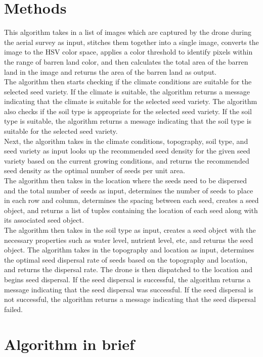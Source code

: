\documentclass[pmlr,twocolumn,10pt]{jmlr}
\begin{document}
\section*{Methods}
 This algorithm takes in a list of images which are captured by the drone during the aerial survey as input, stitches them together into a single image, converts the image to the HSV color space, applies a color threshold to identify pixels within the range of barren land color, and then calculates the total area of the barren land in the image and returns the area of the barren land as output.
 \\The algorithm then starts checking if the climate conditions are suitable for the selected seed variety. If the climate is suitable, the algorithm returns a message indicating that the climate is suitable for the selected seed variety. The algorithm also checks if the soil type is appropriate for the selected seed variety. If the soil type is suitable, the algorithm returns a message indicating that the soil type is suitable for the selected seed variety.
\\Next, the algorithm takes in the climate conditions, topography, soil type, and seed variety as input looks up the recommended seed density for the given seed variety based on the current growing conditions, and returns the recommended seed density as the optimal number of seeds per unit area. 
\\The algorithm then takes in the location where the seeds need to be dispersed and the total number of seeds as input, determines the number of seeds to place in each row and column, determines the spacing between each seed, creates a seed object, and returns a list of tuples containing the location of each seed along with its associated seed object. 
\\The algorithm then takes in the soil type as input, creates a seed object with the necessary properties such as water level, nutrient level, etc, and returns the seed object. The algorithm takes in the topography and location as input, determines the optimal seed dispersal rate of seeds based on the topography and location, and returns the dispersal rate. The drone is then dispatched to the location and begins seed dispersal. If the seed dispersal is successful, the algorithm returns a message indicating that the seed dispersal was successful. If the seed dispersal is not successful, the algorithm returns a message indicating that the seed dispersal failed.

\section*{Algorithm in brief}
\end{document}
